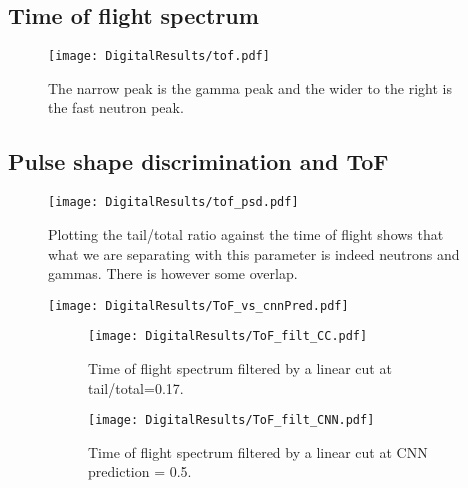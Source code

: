 \documentclass[main.tex]{subfiles}
\begin{document}
\subsection{Time of flight spectrum}
\begin{figure}[ht!]
    \centering
        \texttt{[image: DigitalResults/tof.pdf]}
        \caption{The narrow peak is the gamma peak and the wider to the right is the fast neutron peak.}
    \label{fig:D_PSD_TOF} 
\end{figure}

\subsection{Pulse shape discrimination and ToF}
\begin{figure}[h!]
    \centering
        \texttt{[image: DigitalResults/tof\_psd.pdf]}
        \caption{Plotting the tail/total ratio against the time of flight shows that what we are separating with this parameter is indeed neutrons and gammas. There is however some overlap.}
    \label{fig:tof_digi_cc} 
\end{figure}
\begin{figure}[h!]
    \centering
        \texttt{[image: DigitalResults/ToF\_vs\_cnnPred.pdf]}
        \caption{}
    \label{fig:tof_digi_cnn} 
\end{figure}


\begin{figure}
    \centering
    \begin{subfigure}[b]{\textwidth}
        \texttt{[image: DigitalResults/ToF\_filt\_CC.pdf]}
        \caption{Time of flight spectrum filtered by a linear cut at tail/total=0.17.}
        \label{fig:tof_filt_cc}
    \end{subfigure}
	\begin{subfigure}[b]{\textwidth}
        \texttt{[image: DigitalResults/ToF\_filt\_CNN.pdf]}
        \caption{Time of flight spectrum filtered by a linear cut at CNN prediction = 0.5.}
        \label{fig:tof_digi_filt_cnn}
    \end{subfigure}
    \caption{}
    \label{fig:animals}
\end{figure}
\end{document}
